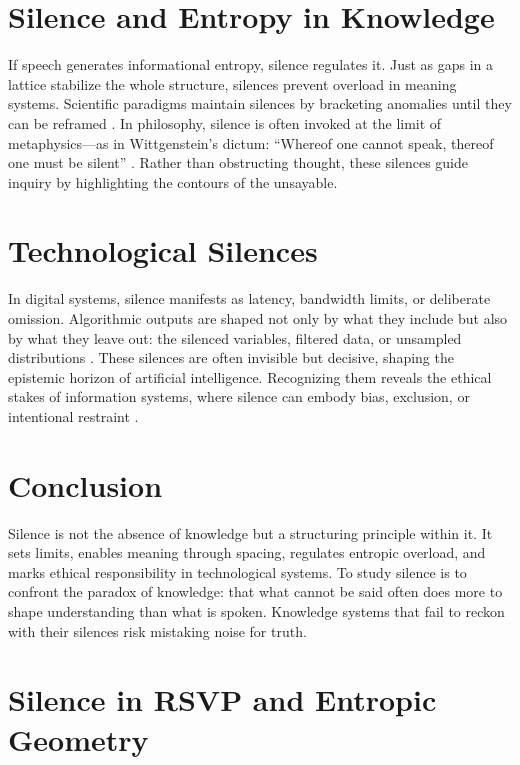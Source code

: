 \documentclass[12pt,a4paper]{article}
\begin{document}
\section{Silence and Entropy in Knowledge}

If speech generates informational entropy, silence regulates it. Just as gaps in a lattice stabilize the whole structure, silences prevent overload in meaning systems. Scientific paradigms maintain silences by bracketing anomalies until they can be reframed \citep{Kuhn1962}. In philosophy, silence is often invoked at the limit of metaphysics—as in Wittgenstein’s dictum: “Whereof one cannot speak, thereof one must be silent” \citep{Wittgenstein1961}. Rather than obstructing thought, these silences guide inquiry by highlighting the contours of the unsayable.

\section{Technological Silences}

In digital systems, silence manifests as latency, bandwidth limits, or deliberate omission. Algorithmic outputs are shaped not only by what they include but also by what they leave out: the silenced variables, filtered data, or unsampled distributions \citep{Gitelman2013}. These silences are often invisible but decisive, shaping the epistemic horizon of artificial intelligence. Recognizing them reveals the ethical stakes of information systems, where silence can embody bias, exclusion, or intentional restraint \citep{Benjamin2019}.

\section{Conclusion}

Silence is not the absence of knowledge but a structuring principle within it. It sets limits, enables meaning through spacing, regulates entropic overload, and marks ethical responsibility in technological systems. To study silence is to confront the paradox of knowledge: that what cannot be said often does more to shape understanding than what is spoken. Knowledge systems that fail to reckon with their silences risk mistaking noise for truth.

\appendix

\section{Silence in RSVP and Entropic Geometry}
\end{document}
